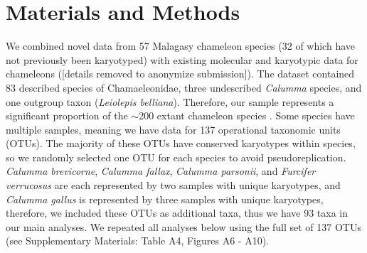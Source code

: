 \documentclass[a4paper, 12pt]{article}
\begin{document}
\section{Materials and Methods}

We combined novel data from 57 Malagasy chameleon species (32 of which have not previously been karyotyped) with existing molecular and karyotypic data for chameleons ([details removed to anonymize submission]). 
The dataset contained 83 described species of Chamaeleonidae, three undescribed \textit{Calumma} species, and one outgroup taxon (\textit{Leiolepis belliana}). 
Therefore, our sample represents a significant proportion of the $\sim$200 extant chameleon species \citep{uetz2022}. 
Some species have multiple samples, meaning we have data for 137 operational taxonomic units (OTUs). 
The majority of these OTUs have conserved karyotypes within species, so we randomly selected one OTU for each species to avoid pseudoreplication.
\textit{Calumma brevicorne}, \textit{Calumma fallax}, \textit{Calumma parsonii}, and \textit{Furcifer verrucosus} are each represented by two samples with unique karyotypes, and \textit{Calumma gallus} is represented by three samples with unique karyotypes, therefore, we included these OTUs as additional taxa, thus we have 93 taxa in our main analyses. 
We repeated all analyses below using the full set of 137 OTUs (see Supplementary Materials: Table A4, Figures A6 - A10).
\end{document}
